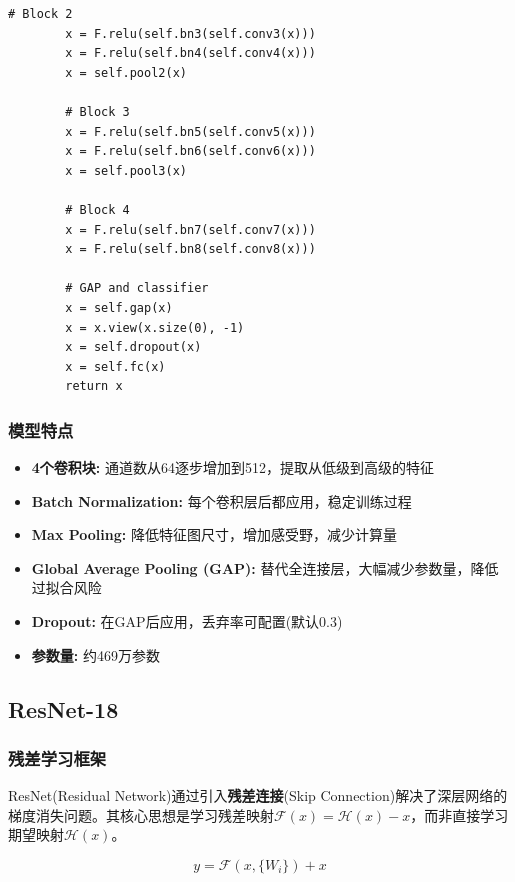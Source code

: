 \documentclass[12pt,a4paper]{article}
\begin{document}
\begin{lstlisting}[caption={CNN模型定义},label={lst:cnn}]
        # Block 2
        x = F.relu(self.bn3(self.conv3(x)))
        x = F.relu(self.bn4(self.conv4(x)))
        x = self.pool2(x)
        
        # Block 3
        x = F.relu(self.bn5(self.conv5(x)))
        x = F.relu(self.bn6(self.conv6(x)))
        x = self.pool3(x)
        
        # Block 4
        x = F.relu(self.bn7(self.conv7(x)))
        x = F.relu(self.bn8(self.conv8(x)))
        
        # GAP and classifier
        x = self.gap(x)
        x = x.view(x.size(0), -1)
        x = self.dropout(x)
        x = self.fc(x)
        return x
\end{lstlisting}

\subsubsection{模型特点}

\begin{itemize}[leftmargin=2em]
    \item \textbf{4个卷积块:} 通道数从64逐步增加到512，提取从低级到高级的特征
    \item \textbf{Batch Normalization:} 每个卷积层后都应用，稳定训练过程
    \item \textbf{Max Pooling:} 降低特征图尺寸，增加感受野，减少计算量
    \item \textbf{Global Average Pooling (GAP):} 替代全连接层，大幅减少参数量，降低过拟合风险
    \item \textbf{Dropout:} 在GAP后应用，丢弃率可配置(默认0.3)
    \item \textbf{参数量:} 约469万参数
\end{itemize}

\subsection{ResNet-18}

\subsubsection{残差学习框架}

ResNet(Residual Network)\cite{he2016deep}通过引入\textbf{残差连接}(Skip Connection)解决了深层网络的梯度消失问题。其核心思想是学习残差映射$\mathcal{F}(x) = \mathcal{H}(x) - x$，而非直接学习期望映射$\mathcal{H}(x)$。

\begin{equation}
    y = \mathcal{F}(x, \{W_i\}) + x
\end{equation}
\end{document}
